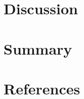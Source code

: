 \documentclass[letterpaper,11pt]{report}
\begin{document}
\chapter{Discussion}\label{ch:discussion}


\chapter{Summary}\label{ch:summary}


\chapter{References}\label{ch:references}
\printbibliography[heading=none,sorting=none]

\end{document}
